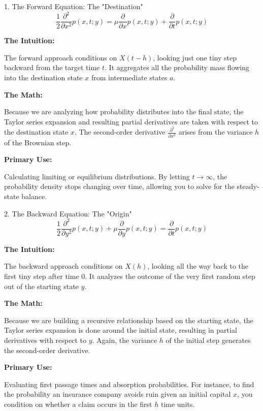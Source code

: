 \documentclass{beamer}
\begin{document}
\begin{frame}{1. The Forward Equation: The "Destination"}
\vspace{-0.3cm}
\[
\frac{1}{2}\frac{\partial^{2}}{\partial x^{2}}p(x,t;y)
=
\mu\frac{\partial}{\partial x}p(x,t;y)
+
\frac{\partial}{\partial t}p(x,t;y)
\]
\vspace{0.1cm}

\textbf{The Intuition:}

The forward approach conditions on $X(t-h)$, looking just one tiny step backward from the target time $t$. It aggregates all the probability mass flowing into the destination state $x$ from intermediate states $a$.

\textbf{The Math:}

Because we are analyzing how probability distributes into the final state, the Taylor series expansion and resulting partial derivatives are taken with respect to the destination state $x$. The second-order derivative $\frac{\partial^{2}}{\partial x^{2}}$ arises from the variance $h$ of the Brownian step.

\textbf{Primary Use:}

Calculating limiting or equilibrium distributions. By letting $t \rightarrow \infty$, the probability density stops changing over time, allowing you to solve for the steady-state balance.

\end{frame}

\begin{frame}{2. The Backward Equation: The "Origin"}
\vspace{-0.3cm}
\[
\frac{1}{2}\frac{\partial^{2}}{\partial y^{2}}p(x,t;y)
+
\mu\frac{\partial}{\partial y}p(x,t;y)
=
\frac{\partial}{\partial t}p(x,t;y)
\]
\vspace{0.1cm}

\textbf{The Intuition:}

The backward approach conditions on $X(h)$, looking all the way back to the first tiny step after time $0$. It analyzes the outcome of the very first random step out of the starting state $y$.

\textbf{The Math:}

Because we are building a recursive relationship based on the starting state, the Taylor series expansion is done around the initial state, resulting in partial derivatives with respect to $y$. Again, the variance $h$ of the initial step generates the second-order derivative.

\textbf{Primary Use:}

Evaluating first passage times and absorption probabilities. For instance, to find the probability an insurance company avoids ruin given an initial capital $x$, you condition on whether a claim occurs in the first $h$ time units.

\end{frame}
\end{document}
